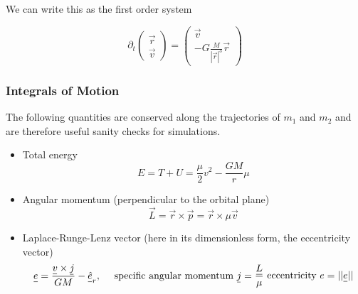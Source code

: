 We can write this as the first order system

\begin{equation}
    \partial_t \begin{pmatrix} \vec{r} \\ \vec{v} \end{pmatrix} = \begin{pmatrix} \vec{v} \\ - G \frac{M}{|\vec{r}|^3} \vec{r} \end{pmatrix}
\end{equation}

\subsubsection{Integrals of Motion}
The following quantities are conserved along the trajectories of $m_1$ and $m_2$ and are therefore useful sanity checks for simulations.

\begin{itemize}
    \item Total energy 
        \begin{equation} E = T + U = \frac{\mu}{2}v^2 - \frac{GM}{r}\mu \end{equation}
    \item Angular momentum (perpendicular to the orbital plane)
        \begin{equation}\vec{L} = \vec{r} \times \vec{p} =  \vec{r} \times \mu \vec{v}\end{equation}
    \item Laplace-Runge-Lenz vector (here in its dimensionless form, the eccentricity vector)
        \begin{equation} \begin{multlined} \vec{e} = \frac{\vec{v} \times \vec{j}}{GM} - \vec{\hat{e}}_r, \quad \text{ specific angular momentum } \vec{j} = \frac{\vec{L}}{\mu} \end{multlined} \\ \text{ eccentricity } e = ||\vec{e}||\end{equation}
\end{itemize}


